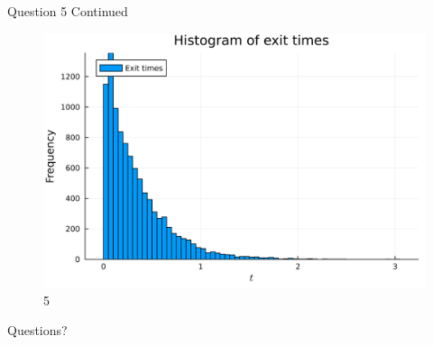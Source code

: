 \documentclass[compress,12pt]{beamer}
\begin{document}
\begin{frame}{Question 5 Continued}
      \begin{figure}[H]
            \centering
            \includegraphics[scale=0.05]{imgs/5exit_times_histogram.png}
            \caption{5}
            \label{fig:5_exittimeshist}
      \end{figure}
\end{frame}

\End
\begin{frame}
      \centering
      Questions?
\end{frame}
\end{document}
